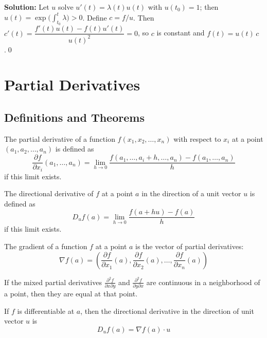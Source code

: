 \bigskip\noindent\textbf{Solution:}
Let $u$ solve $u'(t)=\lambda(t)u(t)$ with $u(t_0)=1$; then $u(t)=\exp\big(\int_{t_0}^t\!\lambda\big)>0$. Define $c=f/u$. Then $c'(t)=\dfrac{f'(t)u(t)-f(t)u'(t)}{u(t)^2}=0$, so $c$ is constant and $f(t)=u(t)\,c$.\qed


\section{Partial Derivatives}

\subsection*{Definitions and Theorems}

\begin{definition}
The partial derivative of a function $f(x_1, x_2, \ldots, x_n)$ with respect to $x_i$ at a point $(a_1, a_2, \ldots, a_n)$ is defined as
\[ \frac{\partial f}{\partial x_i}(a_1, \ldots, a_n) = \lim_{h \to 0} \frac{f(a_1, \ldots, a_i + h, \ldots, a_n) - f(a_1, \ldots, a_n)}{h} \]
if this limit exists.
\end{definition}

\begin{definition}
The directional derivative of $f$ at a point $a$ in the direction of a unit vector $u$ is defined as
\[ D_u f(a) = \lim_{h \to 0} \frac{f(a + hu) - f(a)}{h} \]
if this limit exists.
\end{definition}

\begin{definition}[Gradient]
The gradient of a function $f$ at a point $a$ is the vector of partial derivatives:
\[ \nabla f(a) = \left(\frac{\partial f}{\partial x_1}(a), \frac{\partial f}{\partial x_2}(a), \ldots, \frac{\partial f}{\partial x_n}(a)\right) \]
\end{definition}

\begin{theorem}
If the mixed partial derivatives $\frac{\partial^2 f}{\partial x \partial y}$ and $\frac{\partial^2 f}{\partial y \partial x}$ are continuous in a neighborhood of a point, then they are equal at that point.
\end{theorem}

\begin{theorem}
If $f$ is differentiable at $a$, then the directional derivative in the direction of unit vector $u$ is
\[ D_u f(a) = \nabla f(a) \cdot u \]
\end{theorem}

